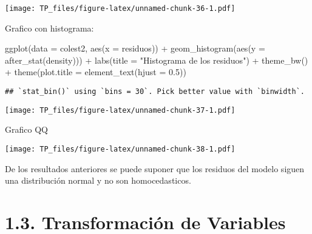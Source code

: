 \documentclass[
]{article}
\newenvironment{Shaded}{\begin{snugshade}}{\end{snugshade}}
\newcommand{\AttributeTok}[1]{\textcolor[rgb]{0.77,0.63,0.00}{#1}}
\newcommand{\FloatTok}[1]{\textcolor[rgb]{0.00,0.00,0.81}{#1}}
\newcommand{\FunctionTok}[1]{\textcolor[rgb]{0.00,0.00,0.00}{#1}}
\newcommand{\NormalTok}[1]{#1}
\newcommand{\SpecialCharTok}[1]{\textcolor[rgb]{0.00,0.00,0.00}{#1}}
\newcommand{\StringTok}[1]{\textcolor[rgb]{0.31,0.60,0.02}{#1}}
\begin{document}
\texttt{[image: TP\_files/figure-latex/unnamed-chunk-36-1.pdf]}

Grafico con histograma:

\begin{Shaded}
\begin{Highlighting}[]
\FunctionTok{ggplot}\NormalTok{(}\AttributeTok{data =}\NormalTok{ colest2, }\FunctionTok{aes}\NormalTok{(}\AttributeTok{x =}\NormalTok{ residuos)) }\SpecialCharTok{+} \FunctionTok{geom\_histogram}\NormalTok{(}\FunctionTok{aes}\NormalTok{(}\AttributeTok{y =} \FunctionTok{after\_stat}\NormalTok{(density))) }\SpecialCharTok{+} 
  \FunctionTok{labs}\NormalTok{(}\AttributeTok{title =} \StringTok{"Histograma de los residuos"}\NormalTok{) }\SpecialCharTok{+} \FunctionTok{theme\_bw}\NormalTok{() }\SpecialCharTok{+} 
  \FunctionTok{theme}\NormalTok{(}\AttributeTok{plot.title =} \FunctionTok{element\_text}\NormalTok{(}\AttributeTok{hjust =} \FloatTok{0.5}\NormalTok{))}
\end{Highlighting}
\end{Shaded}

\begin{verbatim}
## `stat_bin()` using `bins = 30`. Pick better value with `binwidth`.
\end{verbatim}

\texttt{[image: TP\_files/figure-latex/unnamed-chunk-37-1.pdf]}

Grafico QQ

\begin{Shaded}
\end{Shaded}

\texttt{[image: TP\_files/figure-latex/unnamed-chunk-38-1.pdf]}

{ De los resultados anteriores se puede suponer que los residuos del
modelo siguen una distribución normal y no son homocedasticos.}

\hypertarget{transformaciuxf3n-de-variables}{%
\section{\texorpdfstring{{ 1.3. Transformación de
Variables}}{ 1.3. Transformación de Variables}}\label{transformaciuxf3n-de-variables}}
\end{document}
